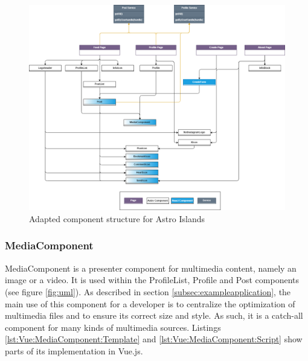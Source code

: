 \documentclass[a4paper, 12pt]{article}
\begin{document}
\begin{figure}[h!]
  \begin{center}
    \includegraphics[width=\linewidth]{diagrams/uml-astro.png}
  \end{center}
  \caption{Adapted component structure for Astro Islands}\label{fig:astroUml}
\end{figure}

\subsubsection{MediaComponent}

MediaComponent is a presenter component for multimedia content, namely an image or a video.
It is used within the ProfileList, Profile and Post components (see figure \ref{fig:uml}).
As described in section \ref{subsec:exampleapplication}, the main use of this component for a developer is to centralize the optimization of multimedia files and to ensure its correct size and style.
As such, it is a catch-all component for many kinds of multimedia sources. Listings \ref{lst:Vue:MediaComponent:Template} and \ref{lst:Vue:MediaComponent:Script} show parts of its implementation in Vue.js.
\end{document}
